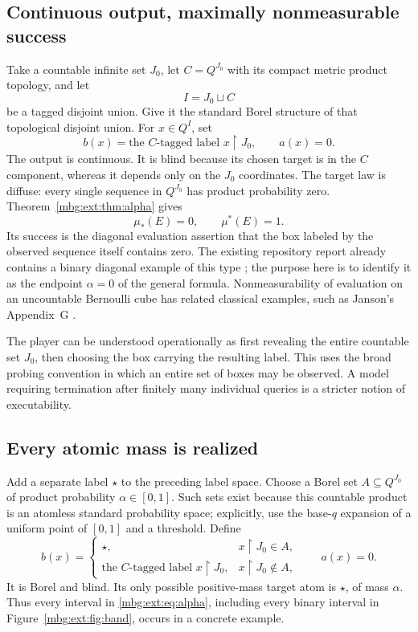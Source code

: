 \documentclass[11pt,letterpaper]{article}
\theoremstyle{definition}
\newcommand{\restr}{\mathbin{\upharpoonright}}
\begin{document}
\subsection{Continuous output, maximally nonmeasurable success}

Take a countable infinite set $J_0$, let $C=Q^{J_0}$ with its compact metric product topology, and let
\[
I=J_0\sqcup C
\]
be a tagged disjoint union. Give it the standard Borel structure of that topological disjoint union. For $x\in Q^I$, set
\[
b(x)=\text{the $C$-tagged label }x\restr J_0,
\qquad a(x)=0.
\]
The output is continuous. It is blind because its chosen target is in the $C$ component, whereas it depends only on the $J_0$ coordinates. The target law is diffuse: every single sequence in $Q^{J_0}$ has product probability zero. Theorem~\ref{mbg:ext:thm:alpha} gives
\[
\mu_*(E)=0,\qquad\mu^*(E)=1.
\]
Its success is the diagonal evaluation assertion that the box labeled by the observed sequence itself contains zero. The existing repository report already contains a binary diagonal example of this type \cite{ext:RepoReport}; the purpose here is to identify it as the endpoint $\alpha=0$ of the general formula. Nonmeasurability of evaluation on an uncountable Bernoulli cube has related classical examples, such as Janson's Appendix~G \cite{ext:Janson}.

The player can be understood operationally as first revealing the entire countable set $J_0$, then choosing the box carrying the resulting label. This uses the broad probing convention in which an entire set of boxes may be observed. A model requiring termination after finitely many individual queries is a stricter notion of executability.

\subsection{Every atomic mass is realized}

Add a separate label $\star$ to the preceding label space. Choose a Borel set $A\subseteq Q^{J_0}$ of product probability $\alpha\in[0,1]$. Such sets exist because this countable product is an atomless standard probability space; explicitly, use the base-$q$ expansion of a uniform point of $[0,1]$ and a threshold. Define
\[
b(x)=
\begin{cases}
\star,&x\restr J_0\in A,\\
\text{the $C$-tagged label }x\restr J_0,&x\restr J_0\notin A,
\end{cases}
\qquad a(x)=0.
\]
It is Borel and blind. Its only possible positive-mass target atom is $\star$, of mass $\alpha$. Thus every interval in \eqref{mbg:ext:eq:alpha}, including every binary interval in Figure~\ref{mbg:ext:fig:band}, occurs in a concrete example.
\end{document}
